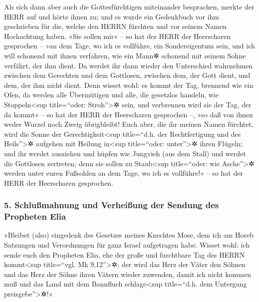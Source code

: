 Als sich dann aber auch die Gottesfürchtigen miteinander
besprachen, merkte der HERR auf und hörte ihnen zu; und es wurde ein
Gedenkbuch vor ihm geschrieben für die, welche den HERRN fürchten und
vor seinem Namen Hochachtung haben.  »Sie sollen mir« --
so hat der HERR der Heerscharen gesprochen -- »an dem Tage, wo ich es
vollführe, ein Sondereigentum sein, und ich will schonend mit ihnen
verfahren, wie ein Mann✲ schonend mit seinem Sohne verfährt, der ihm
dient.  Da werdet ihr dann wieder den Unterschied
wahrnehmen zwischen dem Gerechten und dem Gottlosen, zwischen dem, der
Gott dient, und dem, der ihm nicht dient.  Denn wisset
wohl: es kommt der Tag, brennend wie ein Ofen, da werden alle
Übermütigen und alle, die gesetzlos handeln, wie Stoppeln\textless sup
title=``oder: Stroh''\textgreater✲ sein, und verbrennen wird sie der
Tag, der da kommt« -- so hat der HERR der Heerscharen gesprochen --, »so
daß von ihnen weder Wurzel noch Zweig übrigbleibt!  Euch
aber, die ihr meinen Namen fürchtet, wird die Sonne der
Gerechtigkeit\textless sup title=``d.h. der Rechtfertigung und des
Heils''\textgreater✲ aufgehen mit Heilung in\textless sup title=``oder:
unter''\textgreater✲ ihren Flügeln; und ihr werdet ausziehen und hüpfen
wie Jungvieh (aus dem Stall)  und werdet die Gottlosen
zertreten; denn sie sollen zu Staub\textless sup title=``oder: wie
Asche''\textgreater✲ werden unter euren Fußsohlen an dem Tage, wo ich es
vollführe!« -- so hat der HERR der Heerscharen gesprochen.

\hypertarget{schluuxdfmahnung-und-verheiuxdfung-der-sendung-des-propheten-elia}{%
\subsubsection{5. Schlußmahnung und Verheißung der Sendung des Propheten
Elia}\label{schluuxdfmahnung-und-verheiuxdfung-der-sendung-des-propheten-elia}}

 »Bleibet (also) eingedenk des Gesetzes meines Knechtes
Mose, dem ich am Horeb Satzungen und Verordnungen für ganz Israel
aufgetragen habe.  Wisset wohl: ich sende euch den
Propheten Elia, ehe der große und furchtbare Tag des HERRN
kommt\textless sup title=``vgl. Mk 9,12''\textgreater✲; 
der wird das Herz der Väter den Söhnen und das Herz der Söhne ihren
Vätern wieder zuwenden, damit ich nicht kommen muß und das Land mit dem
Bannfluch schlage\textless sup title=``d.h. dem Untergang
preisgebe''\textgreater✲!«

